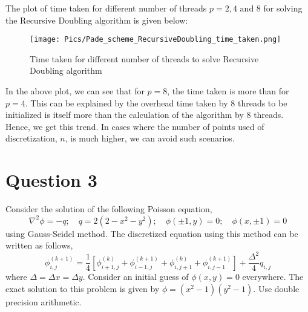 \documentclass[12pt]{article}
\begin{document}
\noindent The plot of time taken for different number of threads $p=2,4 \text{\ and \ } 8$ for solving the Recursive Doubling algorithm is given below:

\begin{figure}[!ht]
    \centering
    \texttt{[image: Pics/Pade\_scheme\_RecursiveDoubling\_time\_taken.png]}
    \caption{Time taken for different number of threads to solve Recursive Doubling algorithm}
    \label{fig:RD_time}
\end{figure}
\newpage
\noindent In the above plot, we can see that for $p=8$, the time taken is more than for $p=4$. This can be explained by the overhead time taken by 8 threads to be initialized is itself more than the calculation of the algorithm by 8 threads. Hence, we get this trend. In cases where the number of points used of discretization, $n$, is much higher, we can avoid such scenarios.

\section*{Question 3}

Consider the solution of the following Poisson equation,
$$
\nabla^2 \phi = -q; \quad q = 2(2-x^2-y^2); \quad \phi(\pm 1, y) = 0; \quad \phi(x, \pm 1) = 0 
$$
using Gauss-Seidel method. The discretized equation using this method can be written as follows,
$$
\phi_{i,j}^{(k+1)} = \frac{1}{4}\left[\phi_{i+1,j}^{(k)} + \phi_{i-1,j}^{(k+1)} + \phi_{i,j+1}^{(k)} + \phi_{i,j-1}^{(k+1)} \right] + \frac{\Delta^2}{4}q_{i,j}
$$
where $\Delta = \Delta x = \Delta y$. Consider an initial guess of $\phi(x,y)= 0$  everywhere. The exact solution to this problem is given by $\phi = (x^2 - 1) (y^2 - 1)$. Use double precision arithmetic.
\end{document}
